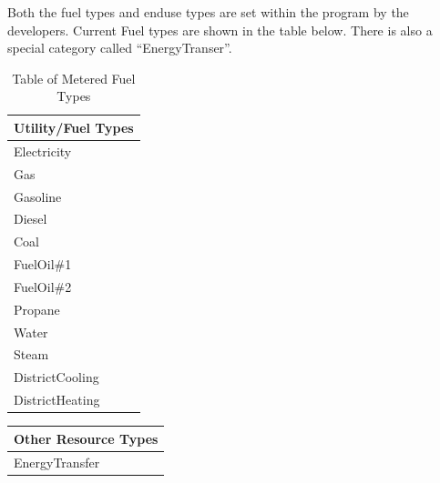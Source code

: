 Both the fuel types and enduse types are set within the program by the developers. Current Fuel types are shown in the table below. There is also a special category called ``EnergyTranser''.

\begin{longtable}[c]{@{}l@{}}
\caption{Table of Metered Fuel Types \protect \label{table:table-of-metered-fuel-types}}\\
\toprule 
Utility/Fuel Types \tabularnewline \midrule
\endhead
Electricity \tabularnewline
Gas \tabularnewline
Gasoline \tabularnewline
Diesel \tabularnewline
Coal \tabularnewline
FuelOil\#1 \tabularnewline
FuelOil\#2 \tabularnewline
Propane \tabularnewline
Water \tabularnewline
Steam \tabularnewline
DistrictCooling \tabularnewline
DistrictHeating \tabularnewline
\bottomrule
\end{longtable}

\begin{longtable}[c]{@{}l@{}}
\toprule 
Other Resource Types \tabularnewline \midrule
\endhead
EnergyTransfer \tabularnewline
\bottomrule
\end{longtable}

